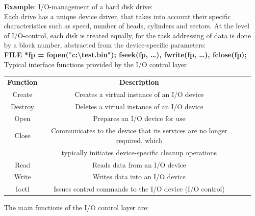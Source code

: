 \textbf{Example}: I/O-management of a hard disk drive:\\

Each drive has a unique device driver, that takes into account their specific characteristics such as speed, number of heads, cylinders and sectors. At the level of I/O-control, each disk is treated equally, for the task addressing of data is done by a block number, abstracted from the device-specific parameters: \\

\textbf{FILE *fp =  fopen("c:{\textbackslash}test.bin"); fseek(fp, {\dots}), fwrite(fp, {\dots}), fclose(fp);}\\

Typical interface functions provided by the\textbf{ }I/O control layer


\begin{table}[h!]
\setlength{\tabcolsep}{10pt} %
\renewcommand{\arraystretch}{1.5} %
\small
\centering
 \begin{tabular}{|c|c|c|c|} \hline
 \textbf{Function} & \textbf{Description} \\ [0.1ex] 
Create & Creates a virtual instance of an I/O device \\ \hline 
Destroy & Deletes a virtual instance of an I/O device \\ \hline 
Open & Prepares an I/O device for use \\ \hline 
Close & Communicates to the device that its services are no longer required, which \\ & typically initiates  device-specific cleanup operations \\ \hline 
Read & Reads data from an I/O device \\ \hline 
Write & Writes data into an I/O device \\ \hline 
Ioctl & Issues control commands to the I/O device (I/O control) \\ \hline 
 \end{tabular}
 \label{Intrinsic}
\end{table}

The main functions of the I/O control layer are:

